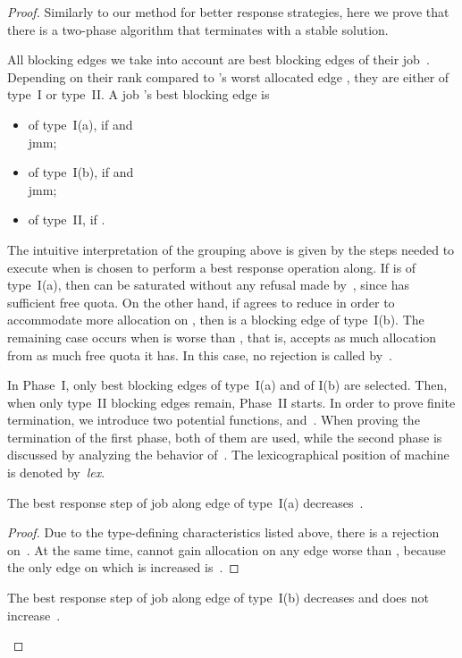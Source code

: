 \documentclass{llncs}
\newcommand{\lex}{{\slshape lex}}
\begin{document}
\begin{proof}

	Similarly to our method for better response strategies, here we prove that there is a two-phase algorithm that terminates with a stable solution. 
	
	All blocking edges we take into account are best blocking edges of their job~. Depending on their rank compared to 's worst allocated edge , they are either of type~I or type~II. A job 's best blocking edge  is \begin{itemize}
	\item of type~I(a), if  and \\ jmm;
	\item of type~I(b), if  and \\ jmm;
	\item of type~II, if .
	\end{itemize}
	The intuitive interpretation of the grouping above is given by the steps needed to execute when  is chosen to perform a best response operation along. If  is of type~I(a), then  can be saturated without any refusal made by~, since  has sufficient free quota. On the other hand, if  agrees to reduce  in order to accommodate more allocation on , then  is a blocking edge of type~I(b). The remaining case occurs when  is worse than , that is,  accepts as much allocation from  as much free quota it has. In this case, no rejection is called by~.
	
	In Phase~I, only best blocking edges of type~I(a) and of I(b) are selected. Then, when only type~II blocking edges remain, Phase~II starts. In order to prove finite termination, we introduce two potential functions,  and~. When proving the termination of the first phase, both of them are used, while the second phase is discussed by analyzing the behavior of~. The lexicographical position of machine  is denoted by~\lex.
	 
	
	\begin{claim}The best response step of job  along edge  of type~I(a) decreases~.
	\end{claim}
	
	\begin{proof}
		Due to the type-defining characteristics listed above, there is a rejection on~. At the same time,  cannot gain allocation on any edge worse than , because the only edge on which  is increased is~. 
	\end{proof}
	
	\begin{claim}
		The best response step of job  along edge  of type~I(b) decreases  and does not increase~.
	\end{claim}
	

\end{proof}
\end{document}
